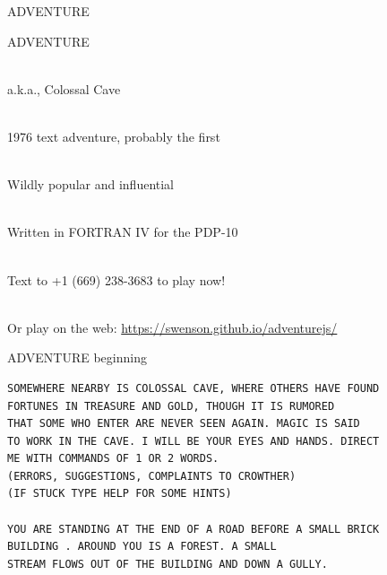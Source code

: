 \documentclass{beamer}
\begin{document}
\begin{frame}{ADVENTURE}

ADVENTURE

\ \\

a.k.a., Colossal Cave

\ \\

1976 text adventure, probably the first

\ \\

Wildly popular and influential

\ \\

Written in FORTRAN IV for the PDP-10

\ \\

Text to +1 (669) 238-3683 to play now!

\ \\
Or play on the web: \url{https://swenson.github.io/adventurejs/}


\end{frame}

\begin{frame}[fragile]{ADVENTURE beginning}

{\footnotesize
\begin{verbatim}
SOMEWHERE NEARBY IS COLOSSAL CAVE, WHERE OTHERS HAVE FOUND
FORTUNES IN TREASURE AND GOLD, THOUGH IT IS RUMORED
THAT SOME WHO ENTER ARE NEVER SEEN AGAIN. MAGIC IS SAID
TO WORK IN THE CAVE. I WILL BE YOUR EYES AND HANDS. DIRECT
ME WITH COMMANDS OF 1 OR 2 WORDS.
(ERRORS, SUGGESTIONS, COMPLAINTS TO CROWTHER)
(IF STUCK TYPE HELP FOR SOME HINTS)

YOU ARE STANDING AT THE END OF A ROAD BEFORE A SMALL BRICK
BUILDING . AROUND YOU IS A FOREST. A SMALL
STREAM FLOWS OUT OF THE BUILDING AND DOWN A GULLY.
\end{verbatim}
}
\end{frame}
\end{document}
